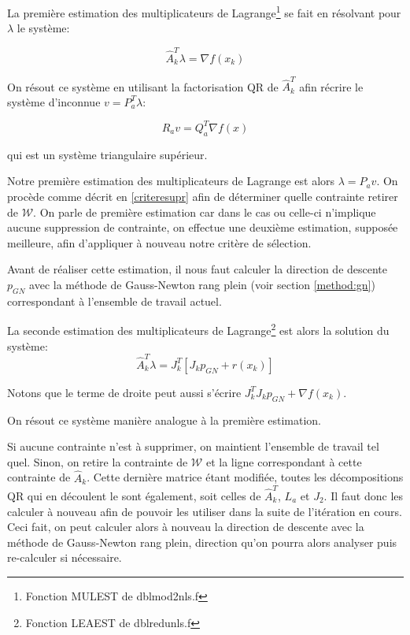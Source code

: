 \documentclass[a4paper,11pt]{article}
\newcommand{\ha}{\hat{A}}
\numberwithin{equation}{section}
\begin{document}
La première estimation des multiplicateurs de Lagrange\footnote{Fonction MULEST de dblmod2nls.f} se fait en résolvant pour $\lambda$ le système:

\begin{equation}
\ha_{k}^T\lambda = \nabla f(x_{k})
\end{equation}

On résout ce système en utilisant la factorisation QR de $\ha_{k}^{T}$ afin récrire le système d'inconnue $v = P_{a}^{T}\lambda$:

$$ R_{a}v = Q_{a}^T\nabla f(x) $$

qui est un système triangulaire supérieur.

Notre première estimation des multiplicateurs de Lagrange est alors $\lambda=P_{a}v$. On procède comme décrit en \ref{criteresupr} afin de déterminer quelle contrainte retirer de $\mathcal{W}$. On parle de première estimation car dans le cas ou celle-ci n'implique aucune suppression de contrainte, on effectue une deuxième estimation, supposée meilleure, afin d'appliquer à nouveau notre critère de sélection.

Avant de réaliser cette estimation, il nous faut calculer la direction de descente $p_{GN}$ avec la méthode de Gauss-Newton rang plein (voir section \ref{method:gn}) correspondant à l'ensemble de travail actuel.

La seconde estimation des multiplicateurs de Lagrange\footnote{Fonction LEAEST de dblredunls.f} est alors la solution du système:
\begin{equation}
\ha_{k}^T\lambda = J_{k}^T\left[J_{k}p_{GN} + r(x_{k})\right]
\end{equation}

Notons que le terme de droite peut aussi s'écrire $J_{k}^{T}J_{k}p_{GN} + \nabla f(x_{k})$.

On résout ce système manière analogue à la première estimation. 


Si aucune contrainte n'est à supprimer, on maintient l'ensemble de travail tel quel. Sinon, on retire la contrainte de $\mathcal{W}$ et la ligne correspondant à cette contrainte de $\ha_{k}$. Cette dernière matrice étant modifiée, toutes les décompositions QR qui en découlent le sont également, soit celles de $\ha_{k}^{T}$, $L_{a}$ et $J_{2}$. Il faut donc les calculer à nouveau afin de pouvoir les utiliser dans la suite de l'itération en cours. Ceci fait, on peut calculer alors à nouveau la direction de descente avec la méthode de Gauss-Newton rang plein, direction qu'on pourra alors analyser puis re-calculer si nécessaire.
\end{document}
